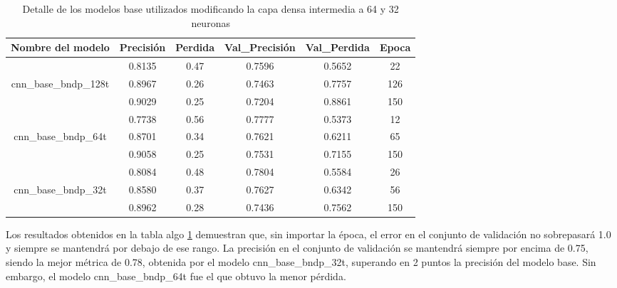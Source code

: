 \begin{table}[!ht]
	\centering
	\begin{tabular}{|c|c|c|c|c|c|}
		\hline
		\textbf{Nombre del modelo} & \textbf{Precisión} & \textbf{Perdida} & \textbf{Val\_Precisión} & \textbf{Val\_Perdida} & \textbf{Epoca} \\ \hline
		~ & 0.8135 & 0.47 & 0.7596 & 0.5652 & 22 \\ \cline{2-6}
		cnn\_base\_bndp\_128t & 0.8967 & 0.26 & 0.7463 & 0.7757 & 126 \\ \cline{2-6}
		~ & 0.9029 & 0.25 & 0.7204 & 0.8861 & 150 \\ \hline
		~ & 0.7738 & 0.56 & 0.7777 & 0.5373 & 12 \\ \cline{2-6}
		cnn\_base\_bndp\_64t & 0.8701 & 0.34 & 0.7621 & 0.6211 & 65 \\ \cline{2-6}
		~ & 0.9058 & 0.25 & 0.7531 & 0.7155 & 150 \\ \hline
		~ & 0.8084 & 0.48 & 0.7804 & 0.5584 & 26 \\ \cline{2-6}
		cnn\_base\_bndp\_32t & 0.8580 & 0.37 & 0.7627 & 0.6342 & 56 \\ \cline{2-6}
		~ & 0.8962 & 0.28 & 0.7436 & 0.7562 & 150 \\ \hline
	\end{tabular}
	\caption{Detalle de los modelos base utilizados modificando la capa densa intermedia a 64 y 32 neuronas}
	\label{tbl:8}
\end{table}

Los resultados obtenidos en la tabla algo \ref{tbl:8} demuestran que, sin importar la época, el error en el conjunto de validación no sobrepasará 1.0 y siempre se mantendrá por debajo de ese rango. La precisión en el conjunto de validación se mantendrá siempre por encima de 0.75, siendo la mejor métrica de 0.78, obtenida por el modelo cnn\_base\_bndp\_32t, superando en 2 puntos la precisión del modelo base. Sin embargo, el modelo cnn\_base\_bndp\_64t fue el que obtuvo la menor pérdida.
